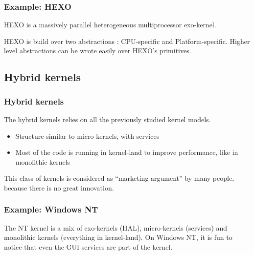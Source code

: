 %
%

\begin{frame}
  \frametitle{Example: HEXO}

  HEXO is a massively parallel heterogeneous multiprocessor
  exo-kernel.

  \begin{center}
  \end{center}

  HEXO is build over two abstractions : CPU-specific and
  Platform-specific. Higher level abstractions can be wrote easily
  over HEXO's primitives.

\end{frame}

%
%

\subsection{Hybrid kernels}

%
%

\begin{frame}
  \frametitle{Hybrid kernels}

  The hybrid kernels relies on all the previously studied kernel
  models.

  \begin{itemize}
  \item
    Structure similar to micro-kernels, with services
  \item
    Most of the code is running in kernel-land to improve performance,
    like in monolithic kernels
  \end{itemize}

  This class of kernels is considered as ``marketing argument'' by
  many people, because there is no great innovation.

\end{frame}

%
%

\begin{frame}
  \frametitle{Example: Windows NT}

  \begin{center}
  \end{center}

  The NT kernel is a mix of exo-kernels (HAL), micro-kernels
  (services) and monolithic kernels (everything in kernel-land). On
  Windows NT, it is fun to notice that even the GUI services are part
  of the kernel.

\end{frame}

